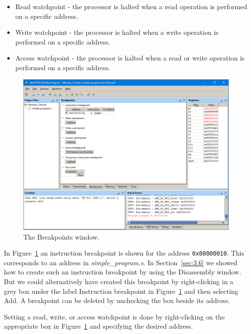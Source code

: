 \documentclass[11pt, twoside, pdftex]{article}
\begin{document}
\begin{itemize}
\item Read watchpoint - the processor is halted when a read
operation is performed on a specific address.
\item Write watchpoint - the processor is halted when a write
operation is performed on a specific address.
\item Access watchpoint - the processor is halted when a read or
write operation is performed on a specific address.
\end{itemize}


\begin{figure}[H]
   \begin{center}
      \includegraphics[scale=0.6]{screenshots/figure34.png}
   \end{center}
   \caption{The Breakpoints window.} 
	 \label{fig:34}
\end{figure}

In Figure~\ref{fig:34} an instruction breakpoint is shown for the 
address \texttt{0x00000010}. This corresponds to an address in
{\it simple\_program.s}. 
In Section~\ref{sec:3.6} we showed how to create such an instruction
breakpoint by using the Disassembly window. But we could
alternatively have created this breakpoint by right-clicking in
a grey box under the label {\sf Instruction breakpoint} in 
Figure~\ref{fig:34} and then selecting {\sf Add}. A breakpoint can be
deleted by unchecking the box beside its address.

Setting a read, write, or access watchpoint is done by
right-clicking on the appropriate box in Figure~\ref{fig:34} and specifying
the desired address.
\end{document}
